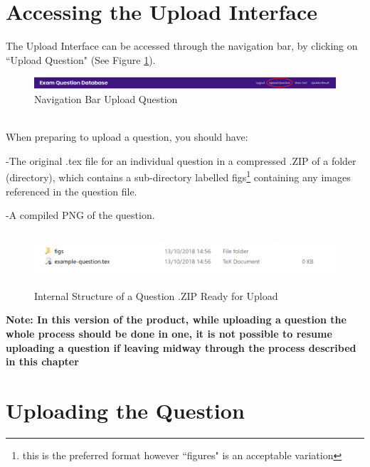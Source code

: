 \documentclass[12pt, a4paper, titlepage]{book}
\begin{document}
\section{Accessing the Upload Interface}
The Upload Interface can be accessed through the navigation bar, by clicking on ``Upload Question" (See Figure \ref{fig:upQ}).
\begin{figure}[htp]
\centering
\includegraphics[width =16cm]{NavBarUpQ.PNG}
\caption{Navigation Bar Upload Question}
\label{fig:upQ}
\end{figure}
\\
When preparing to upload a question, you should have:\par -The original .tex file for an individual question in a compressed .ZIP of a folder (directory), which contains a sub-directory labelled figs\footnote{this is the preferred format however ``figures" is an acceptable variation} containing any images referenced in the question file. \par -A compiled PNG of the question.

\begin{figure}[htp]
\centering
\includegraphics[width = 14cm, height = 2cm]{exampledir.PNG}
\caption{Internal Structure of a Question .ZIP Ready for Upload}
\end{figure}

\textbf{Note: In this version of the product, while uploading a question the whole process should be done in one, it is not possible to resume uploading a question if leaving midway through the process described in this chapter}
\pagebreak
\section{Uploading the Question}
\end{document}
